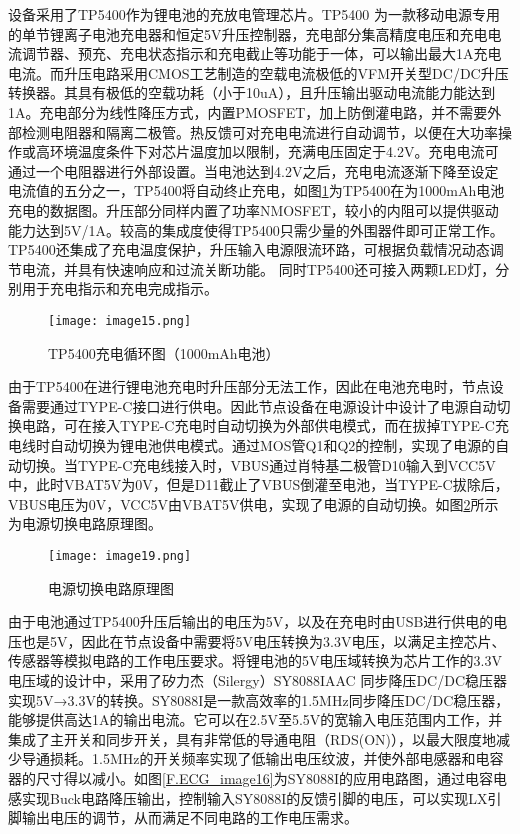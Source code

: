 设备采用了TP5400作为锂电池的充放电管理芯片。TP5400 为一款移动电源专用的单节锂离子电池充电器和恒定5V升压控制器，充电部分集高精度电压和充电电流调节器、预充、充电状态指示和充电截止等功能于一体，可以输出最大1A充电电流。而升压电路采用CMOS工艺制造的空载电流极低的VFM开关型DC/DC升压转换器。其具有极低的空载功耗（小于10uA），且升压输出驱动电流能力能达到1A。充电部分为线性降压方式，内置PMOSFET，加上防倒灌电路，并不需要外部检测电阻器和隔离二极管。热反馈可对充电电流进行自动调节，以便在大功率操作或高环境温度条件下对芯片温度加以限制，充满电压固定于4.2V。充电电流可通过一个电阻器进行外部设置。当电池达到4.2V之后，充电电流逐渐下降至设定电流值的五分之一，TP5400将自动终止充电，如图\ref{F.ECG_image15}为TP5400在为1000mAh电池充电的数据图\cite{TP5400}。升压部分同样内置了功率NMOSFET，较小的内阻可以提供驱动能力达到5V/1A。较高的集成度使得TP5400只需少量的外围器件即可正常工作。TP5400还集成了充电温度保护，升压输入电源限流环路，可根据负载情况动态调节电流，并具有快速响应和过流关断功能。 同时TP5400还可接入两颗LED灯，分别用于充电指示和充电完成指示。

\begin{figure}[hbt]
    \centering
    \texttt{[image: image15.png]}
    \caption{TP5400充电循环图（1000mAh电池）}
    \label{F.ECG_image15}
\end{figure}

由于TP5400在进行锂电池充电时升压部分无法工作，因此在电池充电时，节点设备需要通过TYPE-C接口进行供电。因此节点设备在电源设计中设计了电源自动切换电路，可在接入TYPE-C充电时自动切换为外部供电模式，而在拔掉TYPE-C充电线时自动切换为锂电池供电模式。通过MOS管Q1和Q2的控制，实现了电源的自动切换。当TYPE-C充电线接入时，VBUS通过肖特基二极管D10输入到VCC5V中，此时VBAT5V为0V，但是D11截止了VBUS倒灌至电池，当TYPE-C拔除后，VBUS电压为0V，VCC5V由VBAT5V供电，实现了电源的自动切换。如图\ref{F.ECG_image19}所示为电源切换电路原理图。

\begin{figure}[hbt]
    \centering
    \texttt{[image: image19.png]}
    \caption{电源切换电路原理图}
    \label{F.ECG_image19}
\end{figure}

由于电池通过TP5400升压后输出的电压为5V，以及在充电时由USB进行供电的电压也是5V，因此在节点设备中需要将5V电压转换为3.3V电压，以满足主控芯片、传感器等模拟电路的工作电压要求。将锂电池的5V电压域转换为芯片工作的3.3V电压域的设计中，采用了矽力杰（Silergy）SY8088IAAC 同步降压DC/DC稳压器实现5V→3.3V的转换。SY8088I是一款高效率的1.5MHz同步降压DC/DC稳压器，能够提供高达1A的输出电流。它可以在2.5V至5.5V的宽输入电压范围内工作，并集成了主开关和同步开关，具有非常低的导通电阻（RDS(ON)），以最大限度地减少导通损耗。1.5MHz的开关频率实现了低输出电压纹波，并使外部电感器和电容器的尺寸得以减小。如图\ref{F.ECG_image16}为SY8088I的应用电路图，通过电容电感实现Buck电路降压输出，控制输入SY8088I的反馈引脚的电压，可以实现LX引脚输出电压的调节，从而满足不同电路的工作电压需求。

